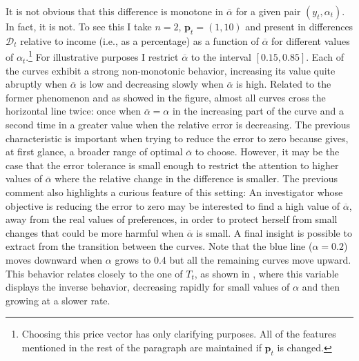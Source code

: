 \documentclass[english, a4paper,12pt]{article}
\begin{document}
It is not obvious that this difference is monotone in $\overline{\alpha}$ for a given pair $(y_{t}, \alpha_{t})$. In fact, it is not. To see this I take $n = 2$, $\mathbf{p}_{t} = (1,10)$ and present in  differences $\mathcal{D}_{t}$ relative to income (i.e., as a percentage) as a function of $\overline{\alpha}$ for different values of $\alpha_{t}$.\footnote{Choosing this price vector has only clarifying purposes. All of the features mentioned in the rest of the paragraph are maintained if $\mathbf{p}_{t}$ is changed.} For illustrative purposes I restrict $\overline{\alpha}$ to the interval $[0.15, 0.85]$. Each of the curves exhibit a strong non-monotonic behavior, increasing its value quite abruptly when $\overline{\alpha}$ is low and decreasing slowly when $\overline{\alpha}$ is high. Related to the former phenomenon and as showed in the figure, almost all curves cross the horizontal line twice: once when $\overline{\alpha} = \alpha$ in the increasing part of the curve and a second time in a greater value when the relative error is decreasing. The previous characteristic is important when trying to reduce the error to zero because gives, at first glance, a broader range of optimal $\overline{\alpha}$ to choose. However, it may be the case that the error tolerance is small enough to restrict the attention to higher values of $\overline{\alpha}$ where the relative change in the difference is smaller. The previous comment also highlights a curious feature of this setting: An investigator whose objective is reducing the error to zero may be interested to find a high value of $\overline{\alpha}$, away from the real values of preferences, in order to protect herself from small changes that could be more harmful when $\overline{\alpha}$ is small. A final insight is possible to extract from the transition between the curves. Note that the blue line ($\alpha = 0.2$) moves downward when $\alpha$ grows to 0.4 but all the remaining curves move upward. This behavior relates closely to the one of $T_{t}$, as shown in , where this variable displays the inverse behavior, decreasing rapidly for small values of $\alpha$ and then growing at a slower rate. 
\end{document}
